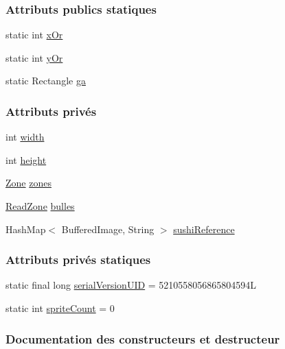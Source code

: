 \subsubsection*{Attributs publics statiques}
\begin{DoxyCompactItemize}
\item 
static int \hyperlink{classSushis_1_1src_1_1IA_aaa01e3156a3a39dd19701e89d4518c2b}{x\+Or}
\item 
static int \hyperlink{classSushis_1_1src_1_1IA_aa970ffebf19547e72c59f109c428ef14}{y\+Or}
\item 
static Rectangle \hyperlink{classSushis_1_1src_1_1ToolBox_a614f944df0493f7be8fcdad36d3265b7}{ga}
\end{DoxyCompactItemize}
\subsubsection*{Attributs privés}
\begin{DoxyCompactItemize}
\item 
int \hyperlink{classSushis_1_1src_1_1IA_ae72069abf3035484ac8c0acd9dadbb4a}{width}
\item 
int \hyperlink{classSushis_1_1src_1_1IA_a0175491438b89afa128cdba5619debbe}{height}
\item 
\hyperlink{classSushis_1_1src_1_1Zone}{Zone} \hyperlink{classSushis_1_1src_1_1IA_a019c981a7f6d249d7b7c54fb08edaa67}{zones}
\item 
\hyperlink{classSushis_1_1src_1_1ReadZone}{Read\+Zone} \hyperlink{classSushis_1_1src_1_1IA_a18b0a2294f283c7922470cea926a198b}{bulles}
\item 
Hash\+Map$<$ Buffered\+Image, String $>$ \hyperlink{classSushis_1_1src_1_1IA_a0e930e667457530a6adbf23aaca3de54}{sushi\+Reference}
\end{DoxyCompactItemize}
\subsubsection*{Attributs privés statiques}
\begin{DoxyCompactItemize}
\item 
static final long \hyperlink{classSushis_1_1src_1_1IA_a0b3532db3833b821234054562c23eff1}{serial\+Version\+U\+I\+D} = 5210558056865804594\+L
\item 
static int \hyperlink{classSushis_1_1src_1_1IA_aa7ae1d8827fe4f4d3af0a5d9cb4f8b62}{sprite\+Count} = 0
\end{DoxyCompactItemize}


\subsubsection{Documentation des constructeurs et destructeur}
\hypertarget{classSushis_1_1src_1_1IA_ae09b1ae66dfec966050bde22afebf409}{}
